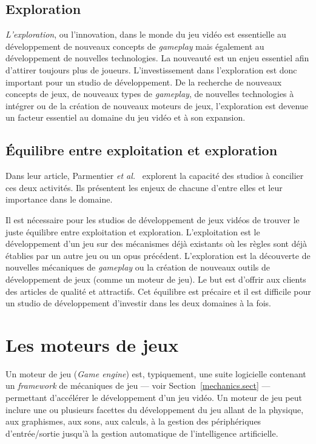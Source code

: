 \subsection{Exploration}
\emph{L'exploration}, ou l'innovation, dans le monde du jeu vidéo est essentielle au développement de nouveaux concepts de \emph{gameplay} mais également au développement de nouvelles technologies.
La nouveauté est un enjeu essentiel afin d'attirer toujours plus de joueurs.
L'investissement dans l'exploration est donc important pour un studio de développement.
De la recherche de nouveaux concepts de jeux, de nouveaux types de \emph{gameplay}, de nouvelles technologies à intégrer ou de la création de nouveaux moteurs de jeux, l'exploration est devenue un facteur essentiel au domaine du jeu vidéo et à son expansion.


\subsection{Équilibre entre exploitation et exploration}
Dans leur article, Parmentier \emph{et al.}~\cite{ParmentierGuy2009Iecd} explorent la capacité des studios à concilier ces deux activités.
Ils présentent les enjeux de chacune d'entre elles et leur importance dans le domaine.

Il est nécessaire pour les studios de développement de jeux vidéos de trouver le juste équilibre entre exploitation et exploration.
L'exploitation est le développement d'un jeu sur des mécanismes déjà existants où les règles sont déjà établies par un autre jeu ou un opus précédent.
L'exploration est la découverte de nouvelles mécaniques de \emph{gameplay} ou la création de nouveaux outils de développement de jeux (comme un moteur de jeu).
Le but est d'offrir aux clients des articles de qualité et attractifs.
Cet équilibre est précaire et il est difficile pour un studio de développement d'investir dans les deux domaines à la fois. 



\section{Les moteurs de jeux}
Un moteur de jeu (\emph{Game engine}) est, typiquement, une suite logicielle contenant un \emph{framework} de mécaniques de jeu --- voir Section~\ref{mechanics.sect} --- permettant d'accélérer le développement d'un jeu vidéo.
Un moteur de jeu peut inclure une ou plusieurs facettes du développement du jeu allant de la physique, aux graphismes, aux sons, aux calculs, à la gestion des périphériques d'entrée/sortie jusqu'à la gestion automatique de l'intelligence artificielle.

